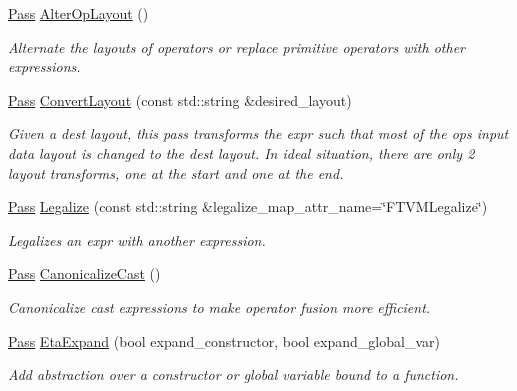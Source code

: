 \begin{DoxyCompactItemize}
\hyperlink{namespacetvm_1_1relay_1_1transform_afa666ade112e9955059095d695238a9a}{Pass} \hyperlink{namespacetvm_1_1relay_1_1transform_a64e0426cfa5887f11769a057c09ce8ba}{Alter\+Op\+Layout} ()
\begin{DoxyCompactList}\small\item\em Alternate the layouts of operators or replace primitive operators with other expressions. \end{DoxyCompactList}\item 
\hyperlink{namespacetvm_1_1relay_1_1transform_afa666ade112e9955059095d695238a9a}{Pass} \hyperlink{namespacetvm_1_1relay_1_1transform_ad12225e2ad26ae24fca669e180026689}{Convert\+Layout} (const std\+::string \&desired\+\_\+layout)
\begin{DoxyCompactList}\small\item\em Given a dest layout, this pass transforms the expr such that most of the ops input data layout is changed to the dest layout. In ideal situation, there are only 2 layout transforms, one at the start and one at the end. \end{DoxyCompactList}\item 
\hyperlink{namespacetvm_1_1relay_1_1transform_afa666ade112e9955059095d695238a9a}{Pass} \hyperlink{namespacetvm_1_1relay_1_1transform_a459fec81f00a7a17c5cf7dabe5e4e363}{Legalize} (const std\+::string \&legalize\+\_\+map\+\_\+attr\+\_\+name=\char`\"{}F\+T\+V\+M\+Legalize\char`\"{})
\begin{DoxyCompactList}\small\item\em Legalizes an expr with another expression. \end{DoxyCompactList}\item 
\hyperlink{namespacetvm_1_1relay_1_1transform_afa666ade112e9955059095d695238a9a}{Pass} \hyperlink{namespacetvm_1_1relay_1_1transform_a93bbf7ab3f612d4f38a6832d6b53b4fd}{Canonicalize\+Cast} ()
\begin{DoxyCompactList}\small\item\em Canonicalize cast expressions to make operator fusion more efficient. \end{DoxyCompactList}\item 
\hyperlink{namespacetvm_1_1relay_1_1transform_afa666ade112e9955059095d695238a9a}{Pass} \hyperlink{namespacetvm_1_1relay_1_1transform_a6e515696ecc9ff4222af99fef361de4e}{Eta\+Expand} (bool expand\+\_\+constructor, bool expand\+\_\+global\+\_\+var)
\begin{DoxyCompactList}\small\item\em Add abstraction over a constructor or global variable bound to a function. \end{DoxyCompactList}\item 

\end{DoxyCompactItemize}
